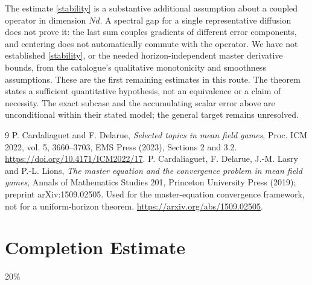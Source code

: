 \documentclass[11pt]{article}
\begin{document}
The estimate \eqref{stability} is a substantive additional assumption about a coupled operator in dimension $Nd$. A spectral gap for a single representative diffusion does not prove it: the last sum couples gradients of different error components, and centering does not automatically commute with the operator. We have not established \eqref{stability}, or the needed horizon-independent master derivative bounds, from the catalogue's qualitative monotonicity and smoothness assumptions. These are the first remaining estimates in this route. The theorem states a sufficient quantitative hypothesis, not an equivalence or a claim of necessity. The exact subcase and the accumulating scalar error above are unconditional within their stated model; the general target remains unresolved.

\begin{thebibliography}{9}
 P. Cardaliaguet and F. Delarue, \emph{Selected topics in mean field games}, Proc. ICM 2022, vol. 5, 3660--3703, EMS Press (2023), Sections 2 and 3.2. \url{https://doi.org/10.4171/ICM2022/17}.
 P. Cardaliaguet, F. Delarue, J.-M. Lasry and P.-L. Lions, \emph{The master equation and the convergence problem in mean field games}, Annals of Mathematics Studies 201, Princeton University Press (2019); preprint arXiv:1509.02505. Used for the master-equation convergence framework, not for a uniform-horizon theorem. \url{https://arxiv.org/abs/1509.02505}.
\end{thebibliography}

\section{Completion Estimate}
20\%
\end{document}
